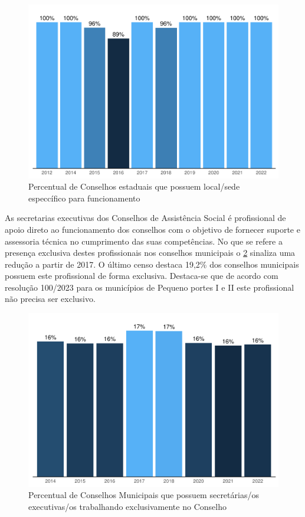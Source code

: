 \documentclass[
  brazilian]{report}
\begin{document}
\begin{figure}
\includegraphics{Censo-SUAS-2022_files/figure-latex/ceas_sede-1} \caption[Percentual de Conselhos estaduais que possuem local/sede especcífico para funcionamento]{Percentual de Conselhos estaduais que possuem local/sede especcífico para funcionamento}\label{fig:ceas_sede}
\end{figure}

As secretarias executivas dos Conselhos de Assistência Social é
profissional de apoio direto ao funcionamento dos conselhos com o
objetivo de fornecer suporte e assessoria técnica no cumprimento das
suas competências. No que se refere a presença exclusiva destes
profissionais nos conselhos municipais o \cref{fig:cmas_se} sinaliza uma
redução a partir de 2017. O último censo destaca 19,2\% dos conselhos
municipais possuem este profissional de forma exclusiva. Destaca-se que
de acordo com resolução 100/2023 para os municípios de Pequeno portes I
e II este profissional não precisa ser exclusivo.

\begin{figure}
\includegraphics{Censo-SUAS-2022_files/figure-latex/cmas_se-1} \caption[Percentual de Conselhos Municipais que possuem secretárias/os executivas/os trabalhando exclusivamente no Conselho]{Percentual de Conselhos Municipais que possuem secretárias/os executivas/os trabalhando exclusivamente no Conselho}\label{fig:cmas_se}
\end{figure}
\end{document}
